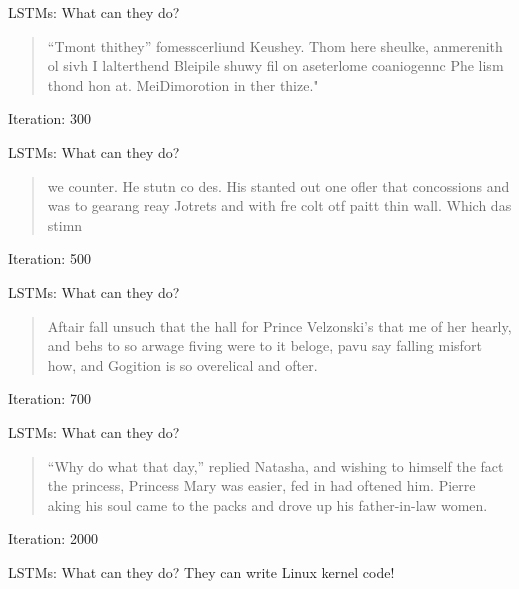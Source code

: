 \begin{slide}{LSTMs: What can they do?}
  \begin{quote}
    ``Tmont thithey'' fomesscerliund
      Keushey. Thom here
      sheulke, anmerenith ol sivh I lalterthend Bleipile shuwy fil on aseterlome
      coaniogennc Phe lism thond hon at. MeiDimorotion in ther thize."
  \end{quote}
  \vspace{0.25cm}
  Iteration: 300
\begin{flushleft}\cite{lstm}\end{flushleft}
\end{slide}

\begin{slide}{LSTMs: What can they do?}
  \begin{quote}
    we counter. He stutn co des. His stanted out one ofler that concossions and was to gearang reay Jotrets and with fre colt otf paitt thin wall. Which das stimn
  \end{quote}
  \vspace{0.25cm}
  Iteration: 500
\begin{flushleft}\cite{lstm}\end{flushleft}
\end{slide}

\begin{slide}{LSTMs: What can they do?}
  \begin{quote}
    Aftair fall unsuch that the hall for Prince Velzonski's that me of
    her hearly, and behs to so arwage fiving were to it beloge, pavu say falling misfort
    how, and Gogition is so overelical and ofter.
  \end{quote}
  \vspace{0.25cm}
  Iteration: 700
\begin{flushleft}\cite{lstm}\end{flushleft}
\end{slide}

\begin{slide}{LSTMs: What can they do?}
  \begin{quote}
    ``Why do what that day,'' replied Natasha, and wishing to himself the fact the princess, Princess Mary was easier, fed in had oftened him. Pierre aking his soul came to the packs and drove up his father-in-law women.
  \end{quote}
  \vspace{0.25cm}
  Iteration: 2000
\begin{flushleft}\cite{lstm}\end{flushleft}
\end{slide}

\begin{slide}{LSTMs: What can they do?}
  {
    \huge
    They can write Linux kernel code!
  }
\end{slide}
